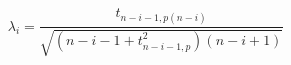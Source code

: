 \documentclass[12pt]{article}
\begin{document}
\pagestyle{empty}
\large
{}
\pagecolor{ehandbook}

\[
\lambda_{i} = \frac{t_{n-i-1,p(n-i)}}
              {\sqrt{(n-i-1+t_{n-i-1,p}^{2}) (n-i+1)}}
\]
\end{document}
